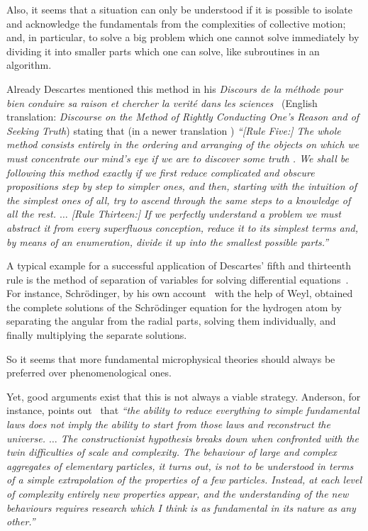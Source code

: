Also, it seems that a situation can only be understood if it is possible to isolate and acknowledge
the fundamentals from the complexities of collective motion;
and, in particular,
to solve a big problem which one cannot solve immediately by dividing it into smaller parts which one can solve,
like subroutines in an algorithm.

Already Descartes mentioned this method in his
{\it Discours de la m{\'e}thode pour bien conduire sa raison et chercher la verit{\'e} dans les sciences}~\cite{Descartes-Discourse}
(English translation: {\em Discourse on the Method of Rightly Conducting One's Reason and of Seeking Truth}) stating that (in a newer translation \cite{Descartes-CW1})
{\em
``[Rule Five:]
The whole method consists entirely in the ordering and arranging of the
objects on which we must concentrate our mind's eye if we are to
discover some truth . We shall be following this method exactly if we first
reduce complicated and obscure propositions step by step to simpler
ones, and then, starting with the intuition of the simplest ones of all, try
to ascend through the same steps to a knowledge of all the rest.
$\ldots$
[Rule Thirteen:]
If we perfectly understand a problem we must abstract it from every
superfluous conception, reduce it to its simplest terms and, by means of
an enumeration, divide it up into the smallest possible parts.''
}

A typical example for a successful application of Descartes' fifth and thirteenth rule is the method of
separation of variables for solving differential equations~\cite{Evans98}.
For instance, Schr\"odinger,
by his own account~\cite{ANDP:ANDP19263840404} with the help of Weyl,
obtained the complete solutions of the Schr\"odinger equation for the hydrogen atom by separating the angular from the radial parts, solving them individually,
and finally multiplying the separate solutions.

So it seems that more fundamental microphysical theories should always be preferred over phenomenological ones.

Yet, good arguments exist that this is not always a viable strategy.
Anderson, for instance, points out~\cite{anderson:73} that
{\em ``the ability to reduce everything to simple fundamental laws does not imply the ability to start from those laws and reconstruct the universe.
$\ldots$
The constructionist hypothesis breaks
down when confronted with the twin
difficulties of scale and complexity. The
behaviour of large and complex aggregates
of elementary particles, it turns
out, is not to be understood in terms
of a simple extrapolation of the properties
of a few particles. Instead, at
each level of complexity entirely new
properties appear, and the understanding
of the new behaviours requires research
which I think is as fundamental
in its nature as any other.'' }



